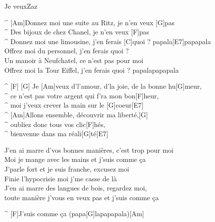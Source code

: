 \begin{song}{Je veux}{Zaz}

\begin{guitar}
^ [Am]Donnez moi une suite au Ritz, je n'en veux [G]pas\\
^ Des bijoux de chez Chanel, je n'en veux [F]pas\\
^ Donnez moi une limousine, j'en ferais [C]quoi ? papala[E7]papapala\\
Offrez moi du personnel, j'en ferais quoi ?\\
Un manoir à Neufchatel, ce n'est pas pour moi\\
Offrez moi la Tour Eiffel, j'en ferais quoi ? papalapapapala\\
\end{guitar}

\begin{guitar}
^ [F]  [G] Je [Am]veux d'l'amour, d'la joie, de la bonne hu[G]meur,\\
^ ce n'est pas votre argent qui f'ra mon bon[F]heur,\\
^ moi j'veux crever la main sur le [G]coeur[E7]\\
^ [Am]Allons ensemble, découvrir ma liberté,[G]\\
^ oubliez donc tous vos clic[F]hés,\\
^ bienvenue dans ma réali[G]té[E7]\\
\end{guitar}

\begin{guitar}
J'en ai marre d'vos bonnes manières, c'est trop pour moi\\
Moi je mange avec les mains et j'suis comme ça\\
J'parle fort et je suis franche, excusez moi\\
Finie l'hypocrisie moi j'me casse de là\\
J'en ai marre des langues de bois, regardez moi,\\
toute manière j'vous en veux pas et j'suis comme ça\\
\end{guitar}

\begin{guitar}
^ [F]J'suis comme ça (papa[G]lapapapala)[Am]\\
\end{guitar}

\end{song}
